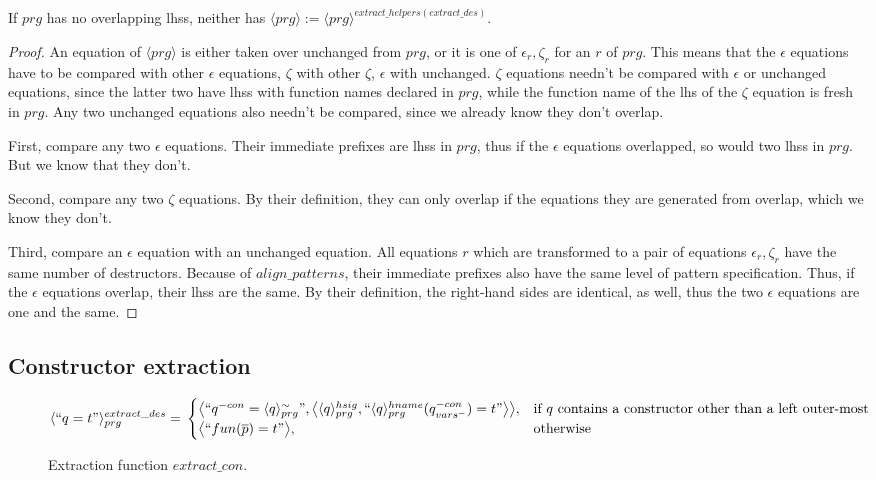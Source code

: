 \begin{lemma}

If $prg$ has no overlapping lhss, neither has $\langle prg \rangle := \langle prg \rangle^{extract\_helpers(extract\_des)}$.

\begin{proof}

An equation of $\langle prg \rangle$ is either taken over unchanged from $prg$, or it is one of $\epsilon_r, \zeta_r$ for an $r$ of $prg$. This means that the $\epsilon$ equations have to be compared with other $\epsilon$ equations, $\zeta$ with other $\zeta$, $\epsilon$ with unchanged. $\zeta$ equations needn't be compared with $\epsilon$ or unchanged equations, since the latter two have lhss with function names declared in $prg$, while the function name of the lhs of the $\zeta$ equation is fresh in $prg$. Any two unchanged equations also needn't be compared, since we already know they don't overlap.

First, compare any two $\epsilon$ equations. Their immediate prefixes are lhss in $prg$, thus if the $\epsilon$ equations overlapped, so would two lhss in $prg$. But we know that they don't.

Second, compare any two $\zeta$ equations. By their definition, they can only overlap if the equations they are generated from overlap, which we know they don't.

Third, compare an $\epsilon$ equation with an unchanged equation. All equations $r$ which are transformed to a pair of equations $\epsilon_r, \zeta_r$ have the same number of destructors. Because of $align\_patterns$, their immediate prefixes also have the same level of pattern specification. Thus, if the $\epsilon$ equations overlap, their lhss are the same. By their definition, the right-hand sides are identical, as well, thus the two $\epsilon$ equations are one and the same.

\end{proof}

\end{lemma}

\subsection{Constructor extraction}

\begin{figure}
\vspace{2.4in}
\[
    \langle `` q = t " \rangle^{extract\_des}_{prg} =\\
\begin{cases}
    \big\langle `` q^{-con} =  \langle q \rangle^{\sim}_{prg} ", \big\langle \langle q \rangle^{hsig}_{prg}, `` \langle q \rangle^{hname}_{prg}(q^{-con}_{vars^-}) = t  " \big\rangle \big\rangle,& \text{if $q$ contains a constructor other than a left outer-most} \\
   \big\langle `` fun(\overline{p}) = t " \big\rangle,& \text{otherwise}
\end{cases}
\]
\caption{Extraction function $extract\_con$.}
\end{figure}


